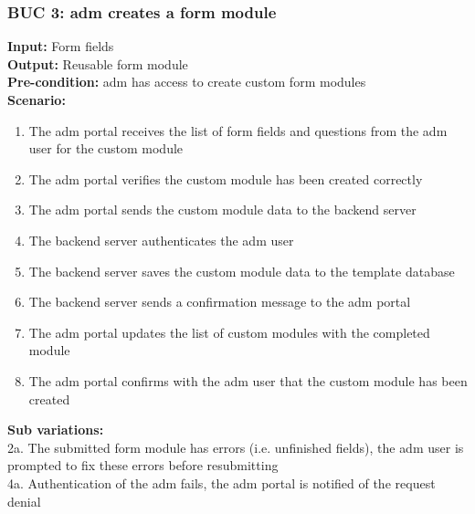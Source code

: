 \documentclass[12pt]{article}
\begin{document}
\subsubsection*{BUC 3: \Gls{adm} creates a form module}
\textbf{Input:} Form fields \\
\textbf{Output:} Reusable form module \\
\textbf{Pre-condition:} \Gls{adm} has access to create custom form modules \\
\textbf{Scenario:} \\
\begin{enumerate}
  \item The \gls{adm} portal receives the list of form fields and questions from the \gls{adm} user for the custom module
  \item The \gls{adm} portal verifies the custom module has been created correctly
  \item The \gls{adm} portal sends the custom module data to the backend server
  \item The backend server authenticates the \gls{adm} user
  \item The backend server saves the custom module data to the template database
  \item The backend server sends a confirmation message to the \gls{adm} portal
  \item The \gls{adm} portal updates the list of custom modules with the completed module
  \item The \gls{adm} portal confirms with the \gls{adm} user that the custom module has been created
\end{enumerate}
\textbf{Sub variations:} \\
2a. The submitted form module has errors (i.e. unfinished fields), the \gls{adm} user is prompted to fix these errors before resubmitting \\
4a. Authentication of the \gls{adm} fails, the \gls{adm} portal is notified of the request denial \\
\end{document}

